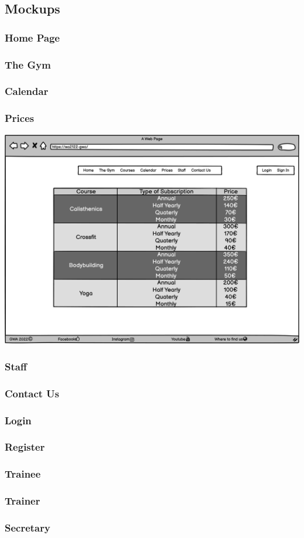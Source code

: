 \newpage
\subsection{Mockups}
\subsubsection{Home Page}
\subsubsection{The Gym}
\subsubsection{Calendar}
\subsubsection{Prices}
\includegraphics[width=\columnwidth]{InterfaceMockup/Prices/prices_page.png}
\subsubsection{Staff}
\subsubsection{Contact Us}
\subsubsection{Login}
\subsubsection{Register}
\subsubsection{Trainee}
\subsubsection{Trainer}
\subsubsection{Secretary}







